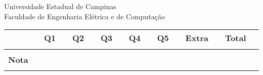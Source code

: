 \documentclass{article}
\begin{document}
\thispagestyle{empty}
\begin{tcolorbox}[colframe=black,colback=gray!20,arc=0pt]
\begin{center}
{\sc\Large Universidade Estadual de Campinas} \vspace{0.5cm} \\
{\sc \large Faculdade de Engenharia Elétrica e de Computação}
\end{center}
\end{tcolorbox}



\noindent
\hrulefill
{}
\hspace{-2.4mm}
\hrulefill
{}
\hspace{-2.4mm}
\hrulefill

\vspace{1cm}

\noindent
	\hfill

\vspace{1cm}

\begin{center}
    \begin{tabular}{|c||c|c|c|c|c|c|c|c|}
      \hline
                 & $\phantom{m}${\bf Q1}$\phantom{m}$ & $\phantom{m}${\bf Q2}$\phantom{m}$ & $\phantom{m}${\bf Q3}$\phantom{m}$ & $\phantom{m}${\bf Q4}$\phantom{m}$ & $\phantom{m}${\bf Q5}$\phantom{m}$ & $\phantom{m}${\bf Extra}$\phantom{m}$ & $\phantom{m}${\bf Total}$\phantom{m}$ \\
      \hline
                 &          &          &          &          &                &&                 \\
      {\bf Nota} &          &          &          &          &                  &&               \\
                 &          &          &          &          &                    &&             \\
      \hline
    \end{tabular}
\end{center}
\end{document}
